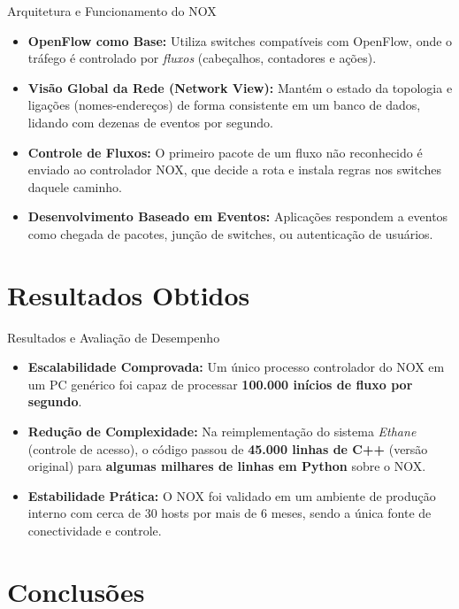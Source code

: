 \documentclass[aspectratio=169,xcolor=dvipsnames]{beamer}
\begin{document}
\begin{frame}{Arquitetura e Funcionamento do NOX}
    \begin{itemize}
        \item \textbf{OpenFlow como Base:} Utiliza switches compatíveis com OpenFlow, onde o tráfego é controlado por \textit{fluxos} (cabeçalhos, contadores e ações).
        \item \textbf{Visão Global da Rede (Network View):} Mantém o estado da topologia e ligações (nomes-endereços) de forma consistente em um banco de dados, lidando com dezenas de eventos por segundo.
        \item \textbf{Controle de Fluxos:} O primeiro pacote de um fluxo não reconhecido é enviado ao controlador NOX, que decide a rota e instala regras nos switches daquele caminho.
        \item \textbf{Desenvolvimento Baseado em Eventos:} Aplicações respondem a eventos como chegada de pacotes, junção de switches, ou autenticação de usuários.
    \end{itemize}
\end{frame}

\section{Resultados Obtidos}

\begin{frame}{Resultados e Avaliação de Desempenho}
    \begin{itemize}
        \item \textbf{Escalabilidade Comprovada:} Um único processo controlador do NOX em um PC genérico foi capaz de processar \textbf{100.000 inícios de fluxo por segundo}.
        \item \textbf{Redução de Complexidade:} Na reimplementação do sistema \textit{Ethane} (controle de acesso), o código passou de \textbf{45.000 linhas de C++} (versão original) para \textbf{algumas milhares de linhas em Python} sobre o NOX.
        \item \textbf{Estabilidade Prática:} O NOX foi validado em um ambiente de produção interno com cerca de 30 hosts por mais de 6 meses, sendo a única fonte de conectividade e controle.
    \end{itemize}
\end{frame}

\section{Conclusões}
\end{document}
